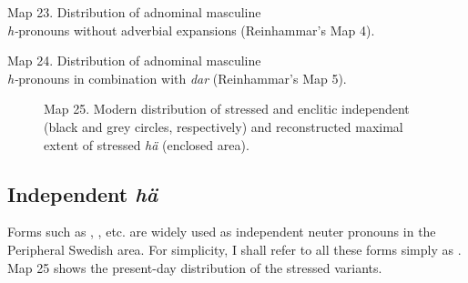 \label{bkm:Ref108601692}Map 23. Distribution of adnominal masculine \\
\textit{h-}pronouns without adverbial expansions (Reinhammar’s Map 4).


\textmd{  }Map 24. Distribution of adnominal masculine \\
\textit{h-}pronouns in combination with \textit{dar} (Reinhammar’s Map 5).


\begin{figure}[h]

\begin{minipage}{2.66667in}

\end{minipage}

\end{figure}



\begin{figure}[h]

\begin{minipage}{5.51042in}

\label{bkm:Ref263951196}Map 25. Modern distribution of stressed and enclitic independent  (black and grey circles, respectively) and reconstructed maximal extent of stressed \textit{hä} (enclosed area).


\end{minipage}

\end{figure}

\subsection{Independent \textit{hä}}

Forms such as , , etc. are widely used as independent neuter pronouns in the Peripheral Swedish area. For simplicity, I shall refer to all these forms simply as . Map 25 shows the present-day distribution of the stressed variants. 

